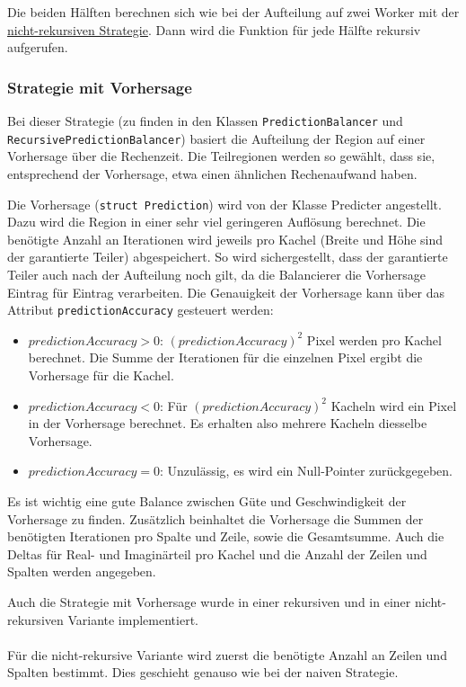 Die beiden Hälften berechnen sich wie bei der Aufteilung auf zwei Worker mit der \hyperref[lastbalancierung_naiv]{nicht-rekursiven Strategie}.
Dann wird die Funktion für jede Hälfte rekursiv aufgerufen.

\subsubsection{Strategie mit Vorhersage}

Bei dieser Strategie (zu finden in den Klassen \verb|PredictionBalancer| und \\ \verb|RecursivePredictionBalancer|) basiert die Aufteilung der Region auf einer Vorhersage über die Rechenzeit.
Die Teilregionen werden so gewählt, dass sie, entsprechend der Vorhersage, etwa einen ähnlichen Rechenaufwand haben.

Die Vorhersage (\verb|struct Prediction|) wird von der Klasse Predicter angestellt.
Dazu wird die Region in einer sehr viel geringeren Auflösung berechnet.
Die benötigte Anzahl an Iterationen wird jeweils pro Kachel (Breite und Höhe sind der garantierte Teiler) abgespeichert.
So wird sichergestellt, dass der garantierte Teiler auch nach der Aufteilung noch gilt, da die Balancierer die Vorhersage Eintrag für Eintrag verarbeiten.
Die Genauigkeit der Vorhersage kann über das Attribut \verb|predictionAccuracy| gesteuert werden:
\begin{itemize}
	\item $predictionAccuracy > 0$: $(predictionAccuracy)^2$ Pixel werden pro Kachel berechnet. Die Summe der Iterationen für die einzelnen Pixel ergibt die Vorhersage für die Kachel.
	\item $predictionAccuracy < 0$: Für $(predictionAccuracy)^2$ Kacheln wird ein Pixel in der Vorhersage berechnet. Es erhalten also mehrere Kacheln diesselbe Vorhersage.
	\item $predictionAccuracy = 0$: Unzulässig, es wird ein Null-Pointer zurückgegeben.
\end{itemize}
Es ist wichtig eine gute Balance zwischen Güte und Geschwindigkeit der Vorhersage zu finden.
Zusätzlich beinhaltet die Vorhersage die Summen der benötigten Iterationen pro Spalte und Zeile, sowie die Gesamtsumme.
Auch die Deltas für Real- und Imaginärteil pro Kachel und die Anzahl der Zeilen und Spalten werden angegeben.

Auch die Strategie mit Vorhersage wurde in einer rekursiven und in einer nicht-rekursiven Variante implementiert.

\paragraph*{}\label{lastbalancierung_vorhersage}
Für die nicht-rekursive Variante wird zuerst die benötigte Anzahl an Zeilen und Spalten bestimmt.
Dies geschieht genauso wie bei der naiven Strategie.

